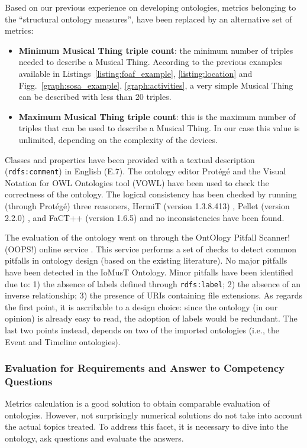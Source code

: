 Based on our previous experience on developing ontologies, metrics belonging to the ``structural ontology measures'', have been replaced by an alternative set of metrics: 
\begin{itemize}
    \item \textbf{Minimum Musical Thing triple count}: the minimum number of triples needed to describe a Musical Thing. According to the previous examples available in Listings~\ref{listing:foaf_example}, \ref{listing:location} and Figg.~\ref{graph:sosa_example}, \ref{graph:activities}, a very simple Musical Thing can be described with less than 20 triples.
    \item \textbf{Maximum Musical Thing triple count}: this is the maximum number of triples that can be used to describe a Musical Thing. In our case this value is unlimited, depending on the complexity of the devices.
\end{itemize}
Classes and properties have been provided with a textual description (\texttt{rdfs:comment}) in English (E.7). The ontology editor Prot{\'e}g{\'e} \cite{protege} and the Visual Notation for OWL Ontologies tool (VOWL) \cite{VOWLpaper} have been used to check the correctness of the ontology. The logical consistency has been checked by running (through Prot\'eg\'e) three reasoners, HermiT (version 1.3.8.413) \cite{shearer2008hermit}, Pellet (version 2.2.0) \cite{parsia2004pellet}, and FaCT++ (version 1.6.5) \cite{tsarkov2006fact++} and no inconsistencies have been found.

The evaluation of the ontology went on through the OntOlogy Pitfall Scanner! (OOPS!) online service \cite{poveda2014oops}. This service performs a set of checks to detect common pitfalls in ontology design (based on the existing literature). No major pitfalls have been detected in the IoMusT Ontology. Minor pitfalls have been identified due to: 1) the absence of labels defined through \texttt{rdfs:label}; 2) the absence of an inverse relationship; 3) the presence of URIs containing file extensions. As regards the first point, it is ascribable to a design choice: since the ontology (in our opinion) is already easy to read, the adoption of labels would be redundant. The last two points instead, depends on two of the imported ontologies (i.e., the Event and Timeline ontologies).

\subsubsection{\textsf{Evaluation for Requirements and Answer to Competency Questions}}
Metrics calculation is a good solution to obtain comparable evaluation of ontologies. However, not surprisingly numerical solutions do not take into account the actual topics treated. To address this facet, it is necessary to dive into the ontology, ask questions and evaluate the answers. 

